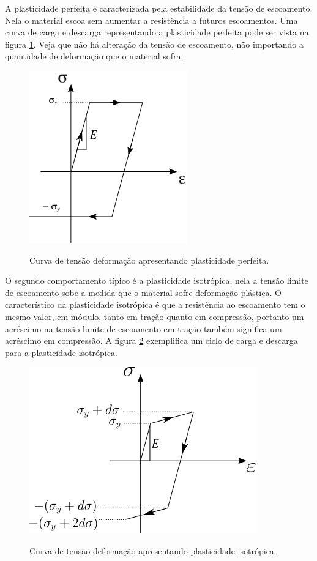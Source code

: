 A plasticidade perfeita é caracterizada pela estabilidade da tensão de escoamento. Nela o material escoa sem aumentar a resistência a futuros escoamentos. Uma curva de carga e descarga representando a plasticidade perfeita pode ser vista na figura \ref{fig:plastperf}. Veja que não há alteração da tensão de escoamento, não importando a quantidade de deformação que o material sofra. \\ 
\begin{figure}[H]
    \centering
    \caption{Curva de tensão deformação apresentando plasticidade perfeita. }
    \includegraphics[width=0.5\linewidth]{images/plasticidade_perfeita.png}
    \label{fig:plastperf}
\end{figure}

O segundo comportamento típico é a plasticidade isotrópica, nela a tensão limite de escoamento sobe a medida que o material sofre deformação plástica. O característico da plasticidade isotrópica é que a resistência ao escoamento tem o mesmo valor, em módulo, tanto em tração quanto em compressão, portanto um acréscimo na tensão limite de escoamento em tração também significa um acréscimo em compressão. A figura \ref{fig:plastiso} exemplifica um ciclo de carga e descarga para a plasticidade isotrópica.

\begin{figure}[H]
    \centering
    \caption{Curva de tensão deformação apresentando plasticidade isotrópica. }
    \includegraphics[width=0.5\linewidth]{images/plasticidade_iso.png}
    \label{fig:plastiso}
\end{figure}


